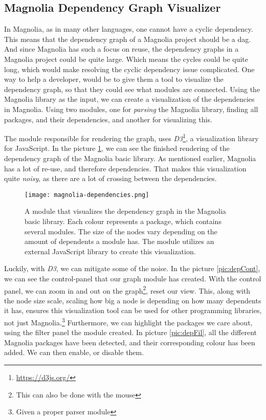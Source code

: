 \subsection{Magnolia Dependency Graph Visualizer}

In Magnolia, as in many other languages, one cannot have a cyclic dependency.
This means that the dependency graph of a Magnolia project should be a
\gls*{dag}. And since Magnolia has such a focus on reuse, the dependency graphs
in a Magnolia project could be quite large. Which means the cycles could be
quite long, which would make resolving the cyclic dependency issue complicated.
One way to help a developer, would be to give them a tool to visualize the
dependency graph, so that they could see what modules are connected. Using the
Magnolia library as the input, we can create a visualization of the dependencies
in Magnolia. Using two modules, one for \textit{parsing} the Magnolia library,
finding all packages, and their dependencies, and another for visualizing
this.

The module responsible for rendering the graph, uses
\textit{D3}\footnote{\url{https://d3js.org/}}, a visualization library for
JavaScript. In the picture \ref{pic:magLib}, we can see the finished rendering
of the dependency graph of the Magnolia basic library. As mentioned earlier,
Magnolia has a lot of re-use, and therefore dependencies. That makes this
visualization quite \textit{noisy}, as there are a lot of crossing between the
dependencies.

\begin{figure}[H]
  \centering
  \texttt{[image: magnolia-dependencies.png]}
  \caption{
    A module that visualizes the dependency graph in the Magnolia basic library.
    Each colour represents a package, which contains several modules. The size
    of the nodes vary depending on the amount of dependents a module has. The
    module utilizes an external JavaScript library to create this visualization.
  }
  \label{pic:magLib}
\end{figure}

Luckily, with \textit{D3}, we can mitigate some of the noise. In the picture
\ref{pic:depCont}, we can see the control-panel that our graph module has
created. With the control panel, we can zoom in and out on the graph\footnote{This can also be done with the mouse},
reset our view. This, along with the node size scale, scaling how big
a node is depending on how many dependents it has, ensures this visualization
tool can be used for other programming libraries, not just Magnolia.\footnote{Given a proper parser module}
Furthermore, we can highlight the packages we care about, using the filter
panel the module created. In picture \ref{pic:depFil}, all the different
Magnolia packages have been detected, and their corresponding colour has been
added. We can then enable, or disable them.

